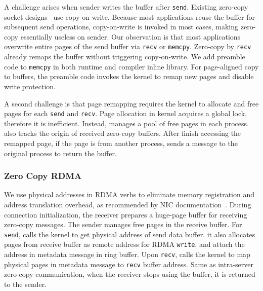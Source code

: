 A challenge arises when sender writes the buffer after \texttt{send}.
Existing zero-copy socket designs~\cite{thadani1995efficient,chu1996zero} use copy-on-write. %
Because most applications reuse the buffer for subsequent send operations, copy-on-write is invoked in most cases, making zero-copy essentially useless on sender.
Our observation is that most applications overwrite entire pages of the send buffer via \texttt{recv} or \texttt{memcpy}. %
Zero-copy by \texttt{recv} already remaps the buffer without triggering copy-on-write.
We add preamble code to \texttt{memcpy} in both \libipc{} runtime and compiler inline library. 
For page-aligned copy to \libipc{} buffers, the preamble code invokes the kernel to remap new pages and disable write protection.

A second challenge is that page remapping requires the kernel to allocate and free pages for each \texttt{send} and \texttt{recv}. Page allocation in kernel acquires a global lock, therefore it is inefficient. Instead, \libipc{} manages a pool of free pages in each process.
\libipc{} also tracks the origin of received zero-copy buffers.
After finish accessing the remapped page, if the page is from another process, \libipc{} sends a message to the original process to return the buffer.

\subsubsection{Zero Copy RDMA}
\label{subsec:zero-copy-rdma}

We use physical addresses in RDMA verbs to eliminate memory registration and address translation overhead, as recommended by NIC documentation~\cite{mellanox}. During connection initialization, the receiver prepares a huge-page buffer for receiving zero-copy messages. The sender manages free pages in the receive buffer. For \texttt{send}, \libipc calls the kernel to get physical address of send data buffer. it also allocates pages from receive buffer as remote address for RDMA \texttt{write}, and attach the address in metadata message in ring buffer. Upon \texttt{recv}, \libipc calls the kernel to map physical pages in metadata message to \texttt{recv} buffer address. 
Same as intra-server zero-copy communication, when the receiver stops using the buffer, it is returned to the sender.

